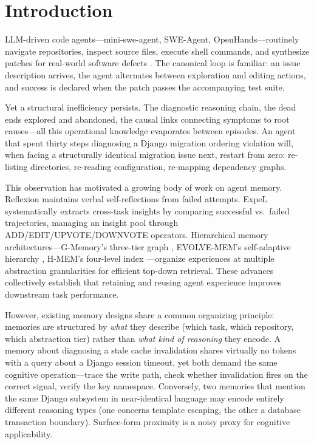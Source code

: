 \documentclass[letterpaper]{article} %
\begin{document}
\section{Introduction}

LLM-driven code agents---mini-swe-agent, SWE-Agent, OpenHands---routinely navigate repositories, inspect source files, execute shell commands, and synthesize patches for real-world software defects \cite{swe-agent, mini-swe-agent, openhands}. The canonical loop is familiar: an issue description arrives, the agent alternates between exploration and editing actions, and success is declared when the patch passes the accompanying test suite.

Yet a structural inefficiency persists. The diagnostic reasoning chain, the dead ends explored and abandoned, the causal links connecting symptoms to root causes---all this operational knowledge evaporates between episodes. An agent that spent thirty steps diagnosing a Django migration ordering violation will, when facing a structurally identical migration issue next, restart from zero: re-listing directories, re-reading configuration, re-mapping dependency graphs.

This observation has motivated a growing body of work on agent memory. Reflexion \cite{reflexion} maintains verbal self-reflections from failed attempts. ExpeL \cite{expel} systematically extracts cross-task insights by comparing successful vs.\ failed trajectories, managing an insight pool through ADD/EDIT/UPVOTE/DOWNVOTE operators. Hierarchical memory architectures---G-Memory's three-tier graph \cite{g-memory}, EVOLVE-MEM's self-adaptive hierarchy \cite{evolve-mem}, H-MEM's four-level index \cite{h-mem}---organize experiences at multiple abstraction granularities for efficient top-down retrieval. These advances collectively establish that retaining and reusing agent experience improves downstream task performance.

However, existing memory designs share a common organizing principle: memories are structured by \emph{what} they describe (which task, which repository, which abstraction tier) rather than \emph{what kind of reasoning} they encode. A memory about diagnosing a stale cache invalidation shares virtually no tokens with a query about a Django session timeout, yet both demand the same cognitive operation---trace the write path, check whether invalidation fires on the correct signal, verify the key namespace. Conversely, two memories that mention the same Django subsystem in near-identical language may encode entirely different reasoning types (one concerns template escaping, the other a database transaction boundary). Surface-form proximity is a noisy proxy for cognitive applicability.
\end{document}
